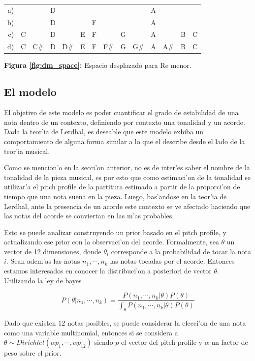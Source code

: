 \begin{center}
\begin{tabular}{r c c c c c c c c c c c c c} 
\label{fig:dm_space}
a) &   &     & D &     &   &   &     &   &     & A &     &   &  \\
b) &   &     & D &     &   & F &     &   &     & A &     &   &  \\
c) & C &     & D &     & E & F &     & G &     & A &     & B & C\\
d) & C & C\# & D & D\# & E & F & F\# & G & G\# & A & A\# & B & C\\
\end{tabular}
\newline
\textbf{Figura \ref{fig:dm_space}:} Espacio desplazado para Re menor.
\end{center}

\subsection{El modelo}
El objetivo de este modelo es poder cuantificar el grado de estabilidad de una nota dentro de un contexto, definiendo por contexto una tonalidad y un acorde. 
Dada la teor'ia de Lerdhal, es deseable que este modelo exhiba un comportamiento de alguna forma similar a lo que el describe desde el lado de la teor'ia musical. 

Como se mencion'o en la secci'on anterior, no es de inter'es saber el nombre de la tonalidad de la pieza musical, es por esto que como estimaci'on de la 
tonalidad se utilizar'a el pitch profile de la partitura estimado a partir de la proporci'on de tiempo que una nota suena en la pieza. Luego, bas'andose en 
la teor'ia de Lerdhal, ante la presencia de un acorde este contexto se ve afectado haciendo que las notas del acorde se conviertan en las m'as probables.  

Esto se puede analizar construyendo un prior basado en el pitch profile, y actualizando ese prior con la observaci'on del acorde. 
Formalmente, sea $\theta$ un vector de 12 dimensiones, donde $\theta_i$ corresponde a la probabilidad de tocar la nota $i$. Sean adem'as las notas $n_1, \cdots, n_k$ las notas 
tocadas por el acorde. Entonces estamos interesados en conocer la distribuci'on a posteriori de vector $\theta$. Utilizando la ley de bayes

$$P(\theta|n_1, \cdots, n_k) = \frac{P(n_1,\cdots, n_k | \theta) P(\theta)}{\int_{\theta}P(n_1, \cdots, n_k | \theta) P(\theta)}$$

Dado que existen 12 notas posibles, se puede considerar la elecci'on de una nota como una variable multinomial, entonces 
si se considera a $\theta \sim Dirichlet(\alpha p_1, \cdots, \alpha p_{12})$ siendo $p$ el vector del pitch profile y $\alpha$ un factor de peso sobre el prior.


